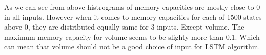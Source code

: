 \documentclass[11pt]{article}
\begin{document}
    As we can see from above histrograms of memory capacities are mostly
close to 0 in all inputs. However when it comes to memory capacities for
each of 1500 states above 0, they are distributed equally same for 3
inputs. Except volume. The maximum memory capacity for volume seems to
be slighty more than 0.1. Which can mean that volume should not be a
good choice of input for LSTM algorithm.


    
    
    
    
\end{document}
